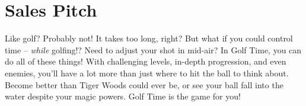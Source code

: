 \documentclass{article}
\begin{document}
\section*{Sales Pitch}
Like golf? Probably not! It takes too long, right? But what if you could control
time -- \emph{while} golfing!? Need to adjust your shot in mid-air? In Golf
Time, you can do all of these things!
With challenging levels, in-depth progression, and even enemies, you'll have a
lot more than just where to hit the ball to think about. Become better than
Tiger Woods could ever be, or see your ball fall into the water despite your
magic powers. Golf Time is the game for you!
\end{document}
